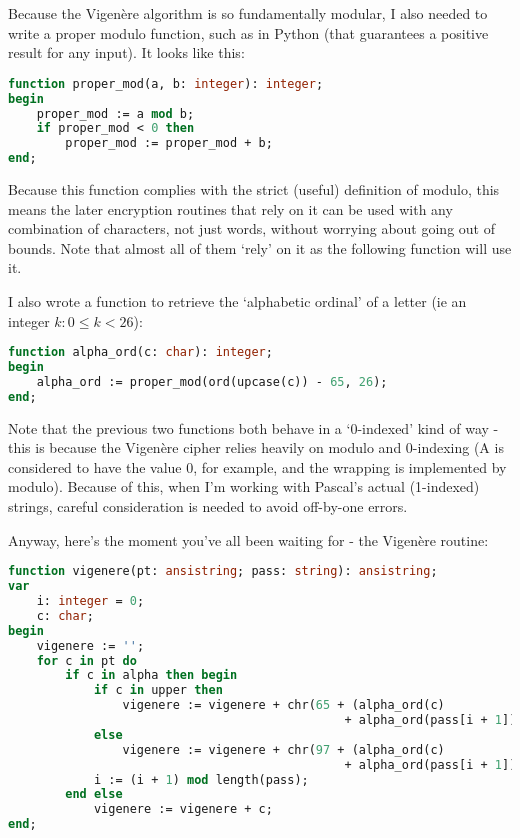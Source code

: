 \documentclass{article}
\begin{document}
    Because the Vigen\`ere algorithm is so fundamentally modular, I also needed
    to write a proper modulo function, such as in Python (that guarantees a
    positive result for any input). It looks like this:

\begin{lstlisting}[language=Pascal, caption=Proper modulo function]
function proper_mod(a, b: integer): integer;
begin
    proper_mod := a mod b;
    if proper_mod < 0 then
        proper_mod := proper_mod + b;
end;
\end{lstlisting}

    Because this function complies with the strict (useful) definition of
    modulo, this means the later encryption routines that rely on it can be
    used with any combination of characters, not just words, without worrying
    about going out of bounds. Note that almost all of them `rely' on it as the
    following function will use it.

    I also wrote a function to retrieve the `alphabetic ordinal' of a letter
    (ie an integer $k: 0 \leq k < 26$):

\begin{lstlisting}[language=Pascal, caption=Proper modulo function]
function alpha_ord(c: char): integer;
begin
    alpha_ord := proper_mod(ord(upcase(c)) - 65, 26);
end;
\end{lstlisting}

    Note that the previous two functions both behave in a `0-indexed' kind of
    way - this is because the Vigen\`ere cipher relies heavily on modulo and
    0-indexing (A is considered to have the value 0, for example, and the
    wrapping is implemented by modulo). Because of this, when I'm working with
    Pascal's actual (1-indexed) strings, careful consideration is needed to
    avoid off-by-one errors.

    Anyway, here's the moment you've all been waiting for - the Vigen\`ere
    routine:

\begin{lstlisting}[language=Pascal, label={lst:overflowbug}, caption=Vigen\`ere algorithm]
function vigenere(pt: ansistring; pass: string): ansistring;
var
    i: integer = 0;
    c: char;
begin
    vigenere := '';
    for c in pt do
        if c in alpha then begin
            if c in upper then
                vigenere := vigenere + chr(65 + (alpha_ord(c)
                                               + alpha_ord(pass[i + 1])) mod 26)
            else
                vigenere := vigenere + chr(97 + (alpha_ord(c)
                                               + alpha_ord(pass[i + 1])) mod 26);
            i := (i + 1) mod length(pass);
        end else
            vigenere := vigenere + c;
end;
\end{lstlisting}
\end{document}
